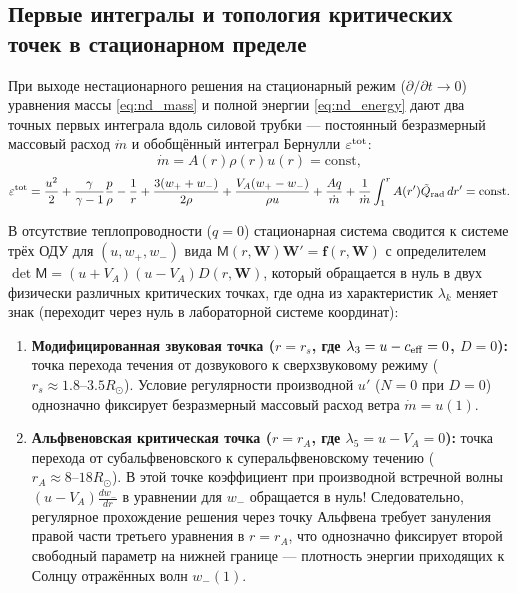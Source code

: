 \documentclass[11pt,a4paper]{article}
\begin{document}
\subsection{Первые интегралы и топология критических точек в стационарном пределе}

При выходе нестационарного решения на стационарный режим ($\partial/\partial t \to 0$) уравнения массы \eqref{eq:nd_mass} и полной энергии \eqref{eq:nd_energy} дают два точных первых интеграла вдоль силовой трубки --- постоянный безразмерный массовый расход $\dot{m}$ и обобщённый интеграл Бернулли $\varepsilon^{\rm tot}$:
\begin{equation}
\dot{m} = A(r)\rho(r)u(r) = \mathrm{const},
\label{eq:int_mass}
\end{equation}
\begin{equation}
\varepsilon^{\rm tot} = \frac{u^2}{2} + \frac{\gamma}{\gamma-1}\frac{p}{\rho} - \frac{1}{r} + \frac{3(w_+ + w_-)}{2\rho} + \frac{V_A(w_+ - w_-)}{\rho u} + \frac{A q}{\dot{m}} + \frac{1}{\dot{m}}\int_1^r A(r')\tilde{Q}_{\rm rad}\,dr' = \mathrm{const}.
\label{eq:int_bernoulli}
\end{equation}

В отсутствие теплопроводности ($q=0$) стационарная система сводится к системе трёх ОДУ для $(u, w_+, w_-)$ вида $\mathsf{M}(r, \bm{W})\bm{W}' = \bm{f}(r, \bm{W})$ с определителем $\det\mathsf{M} = (u + V_A)(u - V_A)D(r, \bm{W})$, который обращается в нуль в двух физически различных критических точках, где одна из характеристик $\lambda_k$ меняет знак (переходит через нуль в лабораторной системе координат):
\begin{enumerate}
\item \textbf{Модифицированная звуковая точка ($r = r_s$, где $\lambda_3 = u - c_{\rm eff} = 0$, $D = 0$):} точка перехода течения от дозвукового к сверхзвуковому режиму ($r_s \approx 1.8\text{--}3.5 R_\odot$). Условие регулярности производной $u'$ ($N = 0$ при $D = 0$) однозначно фиксирует безразмерный массовый расход ветра $\dot{m} = u(1)$.
\item \textbf{Альфвеновская критическая точка ($r = r_A$, где $\lambda_5 = u - V_A = 0$):} точка перехода от субальфвеновского к суперальфвеновскому течению ($r_A \approx 8\text{--}18 R_\odot$). В этой точке коэффициент при производной встречной волны $(u - V_A)\frac{dw_-}{dr}$ в уравнении для $w_-$ обращается в нуль! Следовательно, регулярное прохождение решения через точку Альфвена требует зануления правой части третьего уравнения в $r = r_A$, что однозначно фиксирует второй свободный параметр на нижней границе --- плотность энергии приходящих к Солнцу отражённых волн $w_-(1)$.
\end{enumerate}
\end{document}
